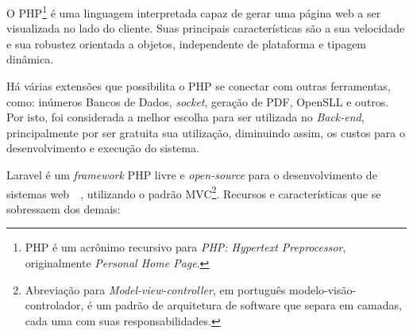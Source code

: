 \documentclass[
  12pt,				%
  openany,
  oneside,
  a4paper,			%
  english,			%
  brazil
]{article}
\numberwithin{figure}{section}
\numberwithin{table}{section}
\newcounter{subsubsubsection}[subsubsection]
\begin{document}
O PHP\footnote{PHP é um acrônimo recursivo para \textit{PHP: Hypertext Preprocessor}, originalmente \textit{Personal Home Page}.} é uma linguagem interpretada capaz de gerar uma página web a ser visualizada no lado do cliente. Suas principais características são a sua velocidade e sua robustez orientada a objetos, independente de plataforma e tipagem dinâmica.

Há várias extensões que possibilita o PHP se conectar com outras ferramentas, como: inúmeros Bancos de Dados, \textit{socket}, geração de PDF, OpenSLL e outros. Por isto, foi considerada a melhor escolha para ser utilizada no \textit{Back-end}, principalmente por ser gratuita sua utilização, diminuindo assim, os custos para o desenvolvimento e execução do sistema.



Laravel é um \textit{framework} PHP livre e \textit{open-source} para o desenvolvimento de sistemas web~\cite{laravel5}~\cite{laravel_kiliccdaugi}, utilizando o padrão MVC\footnote{Abreviação para \textit{Model-view-controller}, em português modelo-visão-controlador, é um padrão de arquitetura de software que separa em camadas, cada uma com suas responsabilidades.}. Recursos e características que se sobressaem dos demais:
\end{document}
